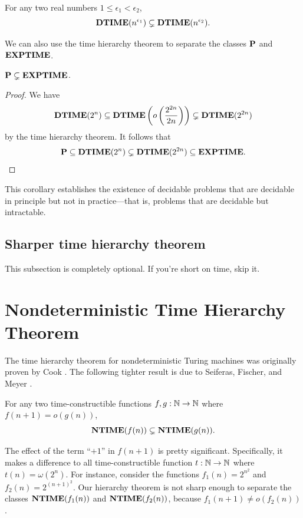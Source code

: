 \documentclass[11pt,twoside=off,numbers=noenddot]{scrbook}
\begin{document}
\begin{corollary}
  For any two real numbers $1 \leq \epsilon_1 < \epsilon_2$,
  \[ \textbf{DTIME}(n^{\epsilon_1}) \subsetneq \textbf{DTIME}(n^{\epsilon_2}). \]
\end{corollary}

We can also use the time hierarchy theorem to separate the classes $\textbf{P}$ and $\textbf{EXPTIME}$.

\begin{corollary}
  $\textbf{P} \subsetneq \textbf{EXPTIME}$.
\end{corollary}

\begin{proof}
  We have
  \[ \textbf{DTIME}(2^n) \subseteq \textbf{DTIME}\left(o\left(\frac{2^{2n}}{2n}\right)\right) \subsetneq \textbf{DTIME}(2^{2n}) \]
  by the time hierarchy theorem. It follows that
  \[ \textbf{P} \subseteq \textbf{DTIME}(2^n) \subsetneq \textbf{DTIME}(2^{2n}) \subseteq \textbf{EXPTIME}. \]
\end{proof}

This corollary establishes the existence of decidable problems that are decidable in principle but not in practice—that is, problems that are decidable but intractable.

\subsection{Sharper time hierarchy theorem}

This subsection is completely optional. If you're short on time, skip it.

\section{Nondeterministic Time Hierarchy Theorem}
The time hierarchy theorem for nondeterministic Turing machines was originally proven by Cook \cite{cook1972hierarchy}. The following tighter result is due to Seiferas, Fischer, and Meyer \cite{seiferas1978separating}.

\begin{theorem}
  For any two time-constructible functions $f, g : \mathbb N \to \mathbb N$ where $f(n + 1) = o(g(n))$,
  \[ \textbf{NTIME}(f(n)) \subsetneq \textbf{NTIME}(g(n)). \]
\end{theorem}

\begin{remark}
  The effect of the term ``$+ 1$'' in $f(n + 1)$ is pretty significant. Specifically, it makes a difference to all time-constructible function $t : \mathbb N \to \mathbb N$ where $t(n) = \omega(2^n)$. For instance, consider the functions $f_1(n) = 2^{n^2}$ and $f_2(n) = 2^{(n + 1)^2}$. Our hierarchy theorem is not sharp enough to separate the classes $\textbf{NTIME}(f_1(n))$ and $\textbf{NTIME}(f_2(n))$, because $f_1(n + 1) \neq o(f_2(n))$.
\end{remark}
\end{document}
